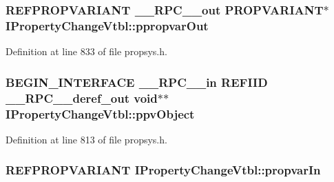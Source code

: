 \subsubsection[{\texorpdfstring{ppropvar\+Out}{ppropvarOut}}]{ {\bf R\+E\+F\+P\+R\+O\+P\+V\+A\+R\+I\+A\+NT} {\bf \+\_\+\+\_\+\+R\+P\+C\+\_\+\+\_\+out} {\bf P\+R\+O\+P\+V\+A\+R\+I\+A\+NT}$\ast$ I\+Property\+Change\+Vtbl\+::ppropvar\+Out}\hypertarget{struct_i_property_change_vtbl_aae85111e853632af672090643d493226}{}\label{struct_i_property_change_vtbl_aae85111e853632af672090643d493226}


Definition at line 833 of file propsys.\+h.

\subsubsection[{\texorpdfstring{ppv\+Object}{ppvObject}}]{\setlength{\rightskip}{0pt plus 5cm}B\+E\+G\+I\+N\+\_\+\+I\+N\+T\+E\+R\+F\+A\+CE {\bf \+\_\+\+\_\+\+R\+P\+C\+\_\+\+\_\+in} {\bf R\+E\+F\+I\+ID} {\bf \+\_\+\+\_\+\+R\+P\+C\+\_\+\+\_\+deref\+\_\+out} {\bf void}$\ast$$\ast$ I\+Property\+Change\+Vtbl\+::ppv\+Object}\hypertarget{struct_i_property_change_vtbl_a404c4df654c43f6fec7a70be06ead309}{}\label{struct_i_property_change_vtbl_a404c4df654c43f6fec7a70be06ead309}


Definition at line 813 of file propsys.\+h.

\subsubsection[{\texorpdfstring{propvar\+In}{propvarIn}}]{ {\bf R\+E\+F\+P\+R\+O\+P\+V\+A\+R\+I\+A\+NT} I\+Property\+Change\+Vtbl\+::propvar\+In}\hypertarget{struct_i_property_change_vtbl_ad9b06bcd77801dbb64de01bfaf923ec1}{}\label{struct_i_property_change_vtbl_ad9b06bcd77801dbb64de01bfaf923ec1}


